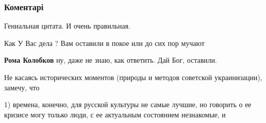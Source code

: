  
 
 
 
 
\subsubsection{Коментарі}

\begin{itemize}
 
Гениальная цитата. И очень правильная.

 
Как У Вас дела ?
Вам оставили в покое или до сих пор мучают

\begin{itemize}
 
\textbf{Рома Колобков} ну, даже не знаю, как ответить. Дай Бог, оставили.
\end{itemize}

 

Не касаясь исторических моментов (природы и методов советской украинизации),
замечу, что 

1) времена, конечно, для русской культуры не самые лучшие, но
говорить о ее кризисе могу только люди, с ее актуальным состоянием незнакомые,
и 


\end{itemize}
